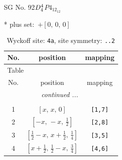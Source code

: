 \documentclass[fleqn,8pt]{jsarticle}
\begin{document}
\setcounter{MaxMatrixCols}{32}

\renewcommand{\tablename}{Table~}
\renewcommand{\figurename}{Figure~}
\begin{center}
\LARGE
SG No. 92\quad$D_{\rm 4}^{4}$\quad$P4_12_12$\quad[ tetragonal ]
\end{center}
* plus set:\,\,\,$+\left[ 0,\, 0,\, 0 \right]$
\renewcommand{\arraystretch}{1.2}
\begin{longtable}{ccc}
\caption{Wyckoff site: {\tt 4a}, site symmetry: {\tt ..2}}
 \\
 \hline \hline
No. & position & mapping \\ \hline \endfirsthead

\multicolumn{2}{l}{\tablename\ \thetable{}} \\
 \hline \hline
No. & position & mapping \\ \hline \endhead

 \hline \hline
\multicolumn{2}{r}{\footnotesize\it continued ...} \\ \endfoot

 \hline \hline
\multicolumn{2}{r}{} \\ \endlastfoot

1 & $\left[ x,\, x,\, 0 \right]$ & {\tt [1,7]} \\ \hline
2 & $\left[ - x,\, - x,\, \frac{1}{2} \right]$ & {\tt [2,8]} \\ \hline
3 & $\left[ \frac{1}{2} - x,\, x + \frac{1}{2},\, \frac{1}{4} \right]$ & {\tt [3,5]} \\ \hline
4 & $\left[ x + \frac{1}{2},\, \frac{1}{2} - x,\, \frac{3}{4} \right]$ & {\tt [4,6]} \\
\end{longtable}
\renewcommand{\arraystretch}{1.2}
\end{document}
